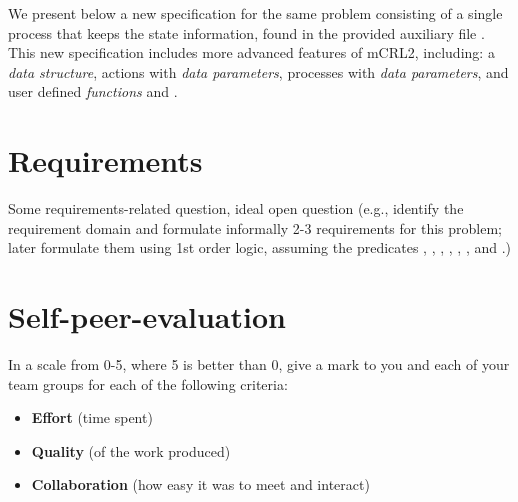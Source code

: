 \documentclass[11pt]{article}
\begin{document}
\begin{myExercise} \label{ex:ba2}
We present below a new specification for the same problem consisting of a single process  that keeps the state information, found in the provided auxiliary file .
This new specification includes more advanced features of mCRL2, including:
a \emph{data structure}, actions with \emph{data parameters}, processes with \emph{data parameters}, and user defined \emph{functions}  and .







\end{myExercise}


\section*{Requirements}
\begin{myExercise} 
  Some requirements-related question, ideal open question (e.g., identify the requirement domain and formulate informally 2-3 requirements for this problem; later formulate them using 1st order logic, assuming the predicates , , , , , , and .)
\end{myExercise}


\section*{Self-peer-evaluation}
\begin{myExercise}
  In a scale from 0-5, where 5 is better than 0, give a mark to you and each of your team groups for each of the following criteria:
  \begin{itemize}
    \item \textbf{Effort} (time spent)
    \item \textbf{Quality} (of the work produced)
    \item \textbf{Collaboration} (how easy it was to meet and interact)
  \end{itemize}
\end{myExercise}
\end{document}
